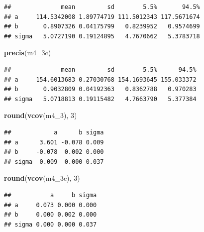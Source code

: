 \documentclass[
]{book}
\newenvironment{Shaded}{\begin{snugshade}}{\end{snugshade}}
\newcommand{\DecValTok}[1]{\textcolor[rgb]{0.00,0.00,0.81}{#1}}
\newcommand{\KeywordTok}[1]{\textcolor[rgb]{0.13,0.29,0.53}{\textbf{#1}}}
\newcommand{\NormalTok}[1]{#1}
\begin{document}
\begin{verbatim}
##              mean         sd        5.5%       94.5%
## a     114.5342008 1.89774719 111.5012343 117.5671674
## b       0.8907326 0.04175799   0.8239952   0.9574699
## sigma   5.0727190 0.19124895   4.7670662   5.3783718
\end{verbatim}

\begin{Shaded}
\begin{Highlighting}[]
\KeywordTok{precis}\NormalTok{(m4\_3c)}
\end{Highlighting}
\end{Shaded}

\begin{verbatim}
##              mean         sd        5.5%      94.5%
## a     154.6013683 0.27030768 154.1693645 155.033372
## b       0.9032809 0.04192363   0.8362788   0.970283
## sigma   5.0718813 0.19115482   4.7663790   5.377384
\end{verbatim}

\begin{Shaded}
\begin{Highlighting}[]
\KeywordTok{round}\NormalTok{(}\KeywordTok{vcov}\NormalTok{(m4\_}\DecValTok{3}\NormalTok{), }\DecValTok{3}\NormalTok{)}
\end{Highlighting}
\end{Shaded}

\begin{verbatim}
##            a      b sigma
## a      3.601 -0.078 0.009
## b     -0.078  0.002 0.000
## sigma  0.009  0.000 0.037
\end{verbatim}

\begin{Shaded}
\begin{Highlighting}[]
\KeywordTok{round}\NormalTok{(}\KeywordTok{vcov}\NormalTok{(m4\_3c), }\DecValTok{3}\NormalTok{)}
\end{Highlighting}
\end{Shaded}

\begin{verbatim}
##           a     b sigma
## a     0.073 0.000 0.000
## b     0.000 0.002 0.000
## sigma 0.000 0.000 0.037
\end{verbatim}
\end{document}
